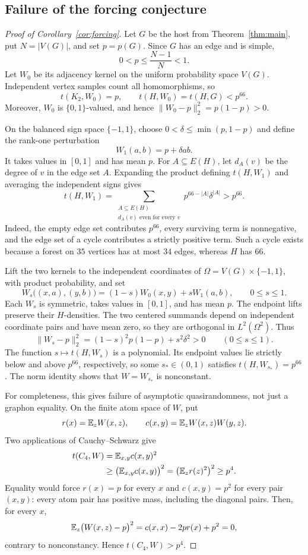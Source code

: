 \subsection{Failure of the forcing conjecture}

\begin{proof}[Proof of Corollary~\ref{cor:forcing}]
Let \(G\) be the host from Theorem~\ref{thm:main}, put
\(N=|V(G)|\), and set \(p=p(G)\). Since \(G\) has an edge and is
simple,
\[
0<p\le\frac{N-1}{N}<1.
\]
Let \(W_0\) be its adjacency kernel on the uniform probability space
\(V(G)\). Independent vertex samples count all homomorphisms, so
\[
t(K_2,W_0)=p,\qquad t(H,W_0)=t(H,G)<p^{66}.
\]
Moreover, \(W_0\) is \(\{0,1\}\)-valued, and hence
\(\|W_0-p\|_2^2=p(1-p)>0\).

On the balanced sign space \(\{-1,1\}\), choose
\(0<\delta\le\min(p,1-p)\) and define the rank-one perturbation
\[
W_1(a,b)=p+\delta ab.
\]
It takes values in \([0,1]\) and has mean \(p\). For
\(A\subseteq E(H)\), let \(d_A(v)\) be the degree of \(v\) in the
edge set \(A\). Expanding the product defining \(t(H,W_1)\) and
averaging the independent signs gives
\[
t(H,W_1)=
\sum_{\substack{A\subseteq E(H)\\ d_A(v)\text{ even for every }v}}
p^{66-|A|}\delta^{|A|}>p^{66}.
\]
Indeed, the empty edge set contributes \(p^{66}\), every surviving
term is nonnegative, and the edge set of a cycle contributes a
strictly positive term. Such a cycle exists because a forest on
\(35\) vertices has at most \(34\) edges, whereas \(H\) has \(66\).

Lift the two kernels to the independent coordinates of
\(\Omega=V(G)\times\{-1,1\}\), with product probability, and set
\[
W_s\bigl((x,a),(y,b)\bigr)
=(1-s)W_0(x,y)+sW_1(a,b),\qquad 0\le s\le1.
\]
Each \(W_s\) is symmetric, takes values in \([0,1]\), and has mean
\(p\). The endpoint lifts preserve their \(H\)-densities. The two
centered summands depend on independent coordinate pairs and have
mean zero, so they are orthogonal in \(L^2(\Omega^2)\). Thus
\[
\|W_s-p\|_2^2=(1-s)^2p(1-p)+s^2\delta^2>0
\qquad(0\le s\le1).
\]
The function \(s\mapsto t(H,W_s)\) is a polynomial. Its endpoint
values lie strictly below and above \(p^{66}\), respectively, so
some \(s_*\in(0,1)\) satisfies \(t(H,W_{s_*})=p^{66}\). The norm
identity shows that \(W=W_{s_*}\) is nonconstant.

For completeness, this gives failure of asymptotic quasirandomness,
not just a graphon equality. On the finite atom space of \(W\), put
\[
r(x)=\mathbb E_z W(x,z),\qquad c(x,y)=\mathbb E_z W(x,z)W(y,z).
\]
Two applications of Cauchy--Schwarz give
\begin{align*}
t(C_4,W)&=\mathbb E_{x,y}c(x,y)^2\\
&\ge\bigl(\mathbb E_{x,y}c(x,y)\bigr)^2
=\bigl(\mathbb E_z r(z)^2\bigr)^2\ge p^4.
\end{align*}
Equality would force \(r(x)=p\) for every \(x\) and
\(c(x,y)=p^2\) for every pair \((x,y)\): every atom pair has positive
mass, including the diagonal pairs.
Then, for every \(x\),
\[
\mathbb E_z\bigl(W(x,z)-p\bigr)^2=c(x,x)-2pr(x)+p^2=0,
\]
contrary to nonconstancy. Hence \(t(C_4,W)>p^4\).


\end{proof}
